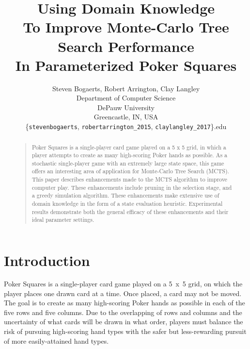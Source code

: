 \documentclass[letterpaper]{article}
\begin{document}
%
\title{Using Domain Knowledge\\To Improve Monte-Carlo Tree Search Performance\\In Parameterized Poker Squares}    %
\author{Steven Bogaerts, Robert Arrington, Clay Langley\\
Department of Computer Science\\
DePauw University\\
Greencastle, IN, USA\\
\{{\tt stevenbogaerts}, {\tt robertarrington\_2015}, {\tt claylangley\_2017}\}{\tt@depauw.edu}
}
\maketitle
\begin{abstract}
\begin{quote}
Poker Squares is a single-player card game played on a 5 x 5 grid, in which a player attempts to create as many high-scoring Poker hands as possible. As a stochastic single-player game with an extremely large state space, this game offers an interesting area of application for Monte-Carlo Tree Search (MCTS). This paper describes enhancements made to the MCTS algorithm to improve computer play. These enhancements include pruning in the selection stage, and a greedy simulation algorithm. These enhancements make extensive use of domain knowledge in the form of a state evaluation heuristic. Experimental results demonstrate both the general efficacy of these enhancements and their ideal parameter settings.
\end{quote}
\end{abstract}

\section{Introduction}

Poker Squares is a single-player card game played on a 5~x~5 grid, on which the player places one drawn card at a time. Once placed, a card may not be moved. The goal is to create as many high-scoring Poker hands as possible in each of the five rows and five columns. Due to the overlapping of rows and columns and the uncertainty of what cards will be drawn in what order, players must balance the risk of pursuing high-scoring hand types with the safer but less-rewarding pursuit of more easily-attained hand types.
\end{document}
